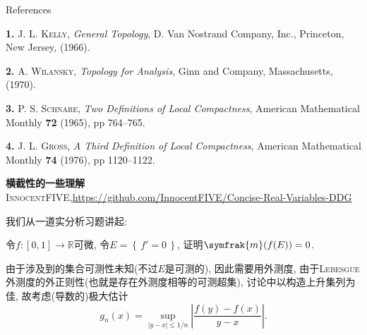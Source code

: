 \documentclass[options]{article}
\begin{document}
{\begin{center}\Large References\end{center}}

\textbf{1.} \textsc{J. L. Kelly}, \textit{General Topology}, D. Van Nostrand Company, Inc., Princeton,
New Jersey, (1966).

\textbf{2.} \textsc{A. Wilansky}, \textit{Topology for Analysis}, Ginn and Company,
Massachusetts, (1970).

\textbf{3.} \textsc{P. S. Schnare}, \textit{Two Definitions of Local Compactness}, American
Mathematical Monthly \textbf{72} (1965), pp 764--765.

\textbf{4.} \textsc{J. L. Gross}, \textit{A Third Definition of Local
	Compactness}, American Mathematical Monthly \textbf{74} (1976), pp 1120--1122.


\linespread{1.3}\selectfont
\begin{center}{\bf\Huge{横截性的一些理解}}\\
	{\textsc{InnocentFIVE},\quad \url{https://github.com/InnocentFIVE/Concise-Real-Variables-DDG}}
\end{center}
我们从一道实分析习题讲起:
\begin{remark}
	令$f\colon[0,1]\to \mathbb R$可微, 令$E=\left\{\,f'=0\,\right\}$, 证明$\symfrak{m}(f(E))=0$.
\end{remark}

由于涉及到的集合可测性未知(不过$E$是可测的), 因此需要用外测度, 由于\textsc{Lebesgue}外测度的外正则性(也就是存在外测度相等的可测超集), 讨论中以构造上升集列为佳, 故考虑(导数的)极大估计
\[g_n(x)=\sup_{|y-x|\leqslant 1/n}\left| \frac{f(y)-f(x)}{y-x} \right|.\]
\end{document}
